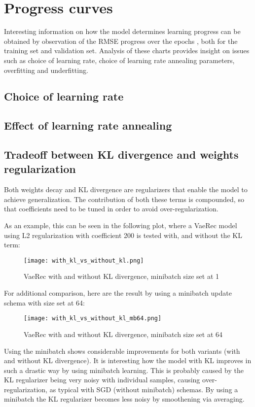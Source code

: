 \section{Progress curves}

Interesting information on how the model determines learning progress
can be obtained by observation of the RMSE progress over the epochs , both for the
training set and validation set. 
Analysis of these charts provides insight on issues such as choice of learning rate,
choice of learning rate annealing parameters, overfitting and underfitting.

\subsection{Choice of learning rate}

\subsection{Effect of learning rate annealing}

\subsection{Tradeoff between KL divergence and weights regularization}

Both weights decay and KL divergence are regularizers that enable the model to achieve
generalization. The contribution of both these terms is compounded, so that 
coefficients need to be tuned in order to avoid over-regularization.

As an example, this can be seen in the following plot, where a VaeRec model
using L2 regularization with coefficient 200 is tested with, and without
the KL term:

\begin{figure}[H]
\texttt{[image: with\_kl\_vs\_without\_kl.png]}
\caption{VaeRec with and without KL divergence, minibatch size set at 1}
\end{figure}

For additional comparison, here are the result by using a minibatch update schema
with size set at 64:

\begin{figure}[H]
\texttt{[image: with\_kl\_vs\_without\_kl\_mb64.png]}
\caption{VaeRec with and without KL divergence, minibatch size set at 64}
\end{figure}

Using the minibatch shows considerable improvements for both variants (with and without KL
divergence).  It is interesting how the model with KL improves in such a drastic way
by using minibatch learning. This is probably caused by the KL regularizer being
very noisy with individual samples, causing over-regularization, as typical with SGD
(without minibatch) schemas. By using a minibatch
the KL regularizer becomes less noisy by smoothening via averaging. 


